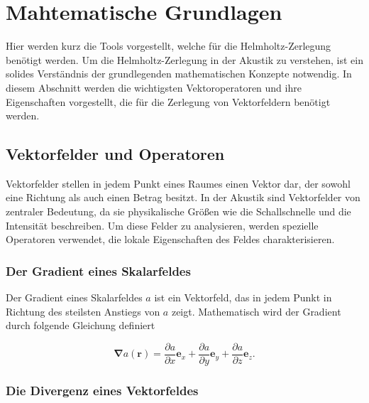 %
%
%
%
\section{Mahtematische Grundlagen
\label{helmholtz:section:Mahtematische_Grundlagen}}

Hier werden kurz die Tools vorgestellt, welche für die Helmholtz-Zerlegung benötigt werden. Um die Helmholtz-Zerlegung in der Akustik zu verstehen, ist ein solides Verständnis der grundlegenden mathematischen Konzepte notwendig. In diesem Abschnitt werden die wichtigsten Vektoroperatoren und ihre Eigenschaften vorgestellt, die für die Zerlegung von Vektorfeldern benötigt werden.

\subsection{Vektorfelder und Operatoren
\label{helmholtz:subsection:Vektorfelder_Operatoren}}

Vektorfelder stellen in jedem Punkt eines Raumes einen Vektor dar, der sowohl eine Richtung als auch einen Betrag besitzt. In der Akustik sind Vektorfelder von zentraler Bedeutung, da sie physikalische Größen wie die Schallschnelle und die Intensität beschreiben. Um diese Felder zu analysieren, werden spezielle Operatoren verwendet, die lokale Eigenschaften des Feldes charakterisieren.

\subsubsection{Der Gradient eines Skalarfeldes}

Der Gradient eines Skalarfeldes $a$ ist ein Vektorfeld, das in jedem Punkt in Richtung des steilsten Anstiegs von $a$ zeigt. Mathematisch wird der Gradient durch folgende Gleichung definiert

\begin{equation}
\mathbf{\nabla} a (\mathbf{r}) = \frac{\partial a}{\partial x}\mathbf{e}_x + \frac{\partial a}{\partial y}\mathbf{e}_y + \frac{\partial a}{\partial z}\mathbf{e}_z.
\end{equation}



\subsubsection{Die Divergenz eines Vektorfeldes}

